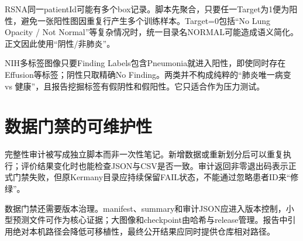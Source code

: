 RSNA同一patientId可能有多个box记录。脚本先聚合，只要任一Target为1便为阳性，避免一张阳性图因重复行产生多个训练样本。Target=0包括``No Lung Opacity / Not Normal''等复杂情况时，统一目录名NORMAL可能造成语义简化。正文因此使用“阴性/非肺炎”。

NIH多标签图像只要Finding Labels包含Pneumonia就进入阳性，即使同时存在Effusion等标签；阴性只取精确No Finding。两类并不构成纯粹的“肺炎唯一病变 vs 健康”，且报告挖掘标签有假阴性和假阳性。它只适合作为压力测试。

\section{数据门禁的可维护性}

完整性审计被写成独立脚本而非一次性笔记。新增数据或重新划分后可以重复执行；评价结果变化时也能检查JSON与CSV是否一致。审计返回非零退出码表示正式门禁失败，但原Kermany目录应持续保留FAIL状态，不能通过忽略患者ID来“修绿”。

数据门禁还需要版本治理。manifest、summary和审计JSON应进入版本控制，小型预测文件可作为核心证据；大图像和checkpoint由哈希与release管理。报告中引用绝对本机路径会降低可移植性，最终公开结果应同时提供仓库相对路径。
